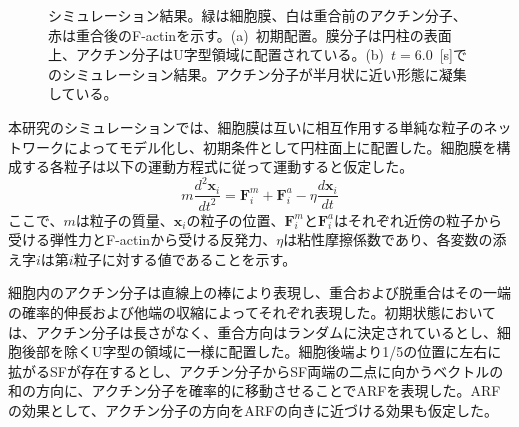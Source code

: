 \documentclass[10pt,twocolumn,a4j]{jarticle}
\begin{document}
\begin{figure}[tbp]
\centering
 \caption{シミュレーション結果。緑は細胞膜、白は重合前のアクチン分子、赤は重合後のF-actinを示す。(a)~初期配置。膜分子は円柱の表面上、アクチン分子はU字型領域に配置されている。(b)~$t=6.0$~[s]でのシミュレーション結果。アクチン分子が半月状に近い形態に凝集している。}
 \label{fig:res0}
\end{figure}
本研究のシミュレーションでは、細胞膜は互いに相互作用する単純な粒子のネットワークによってモデル化し、初期条件として円柱面上に配置した。細胞膜を構成する各粒子は以下の運動方程式に従って運動すると仮定した。
\begin{equation}
m\frac{d^2\bm{x}_i}{dt^2} = \bm{F}^m_i +  \bm{F}^a_i - \eta \frac{d\bm{x}_i}{dt}
\end{equation}
ここで、$m$は粒子の質量、$\bm{x}_i$の粒子の位置、$\bm{F}^m_i$と$\bm{F}^a_i$はそれぞれ近傍の粒子から受ける弾性力とF-actinから受ける反発力、$\eta$は粘性摩擦係数であり、各変数の添え字$i$は第$i$粒子に対する値であることを示す。

細胞内のアクチン分子は直線上の棒により表現し、重合および脱重合はその一端の確率的伸長゙および他端の収縮によってそれぞれ表現した。初期状態においては、アクチン分子は長さがなく、重合方向はランダムに決定されているとし、細胞後部を除くU字型の領域に一様に配置した。細胞後端より1/5の位置に左右に拡がるSFが存在するとし、アクチン分子からSF両端の二点に向かうベクトルの和の方向に、アクチン分子を確率的に移動させることでARFを表現した。ARFの効果として、アクチン分子の方向をARFの向きに近づける効果も仮定した。
\end{document}
